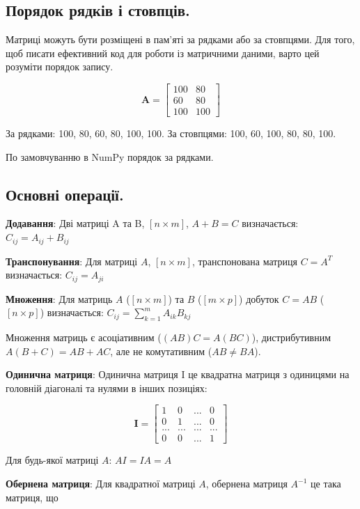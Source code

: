 \subsection{Порядок рядків і стовпців.}

Матриці можуть бути розміщені в пам'яті за рядками або за стовпцями. Для того, щоб писати ефективний код для роботи із матричними даними, варто цей розуміти порядок запису.

$$
\mathbf{A} = \begin{bmatrix}
100 & 80 \\
60 & 80 \\
100 & 100
\end{bmatrix}
$$

За рядками: 100, 80, 60, 80, 100, 100. За стовпцями: 100, 60, 100, 80, 80, 100. 

 По замовчуванню в NumPy порядок за рядками.



\subsection{Основні операції.}


\textbf{Додавання}: Дві матриці A та B, $[n\times m]$, $A+B=C$ визначається: $C_{ij}=A_{ij}+B_{ij}$

\textbf{Транспонування}: Для матриці $A$, $[n\times m]$, транспонована матриця $C=A^{T}$ визначається: $C_{ij}=A_{ji}$

\textbf{Множення}: Для матриць $A$ ($[n\times m]$) та $B$ ($[m\times p]$) добуток $C=AB$ ($[n\times p]$) визначається: $C_{ij}=\sum_{k=1}^{m}A_{ik}B_{kj}$

Множення матриць є асоціативним ($(AB)C=A(BC)$), дистрибутивним $A(B+C)=AB+AC$, але не комутативним ($AB\neq BA$).

\textbf{Одинична матриця}: Одинична матриця I це квадратна матриця з одиницями на головній діагоналі та нулями в інших позиціях:

$$
\mathbf{I} = \begin{bmatrix}
1 & 0 & ... & 0 \\
0 & 1 & ... & 0 \\
... & ... & ... & ... \\
0 & 0 & ... & 1
\end{bmatrix}
$$

Для будь-якої матриці $A$: $AI=IA=A$

\textbf{Обернена матриця}: Для квадратної матриці $A$, обернена матриця $A^{-1}$ це така матриця, що

